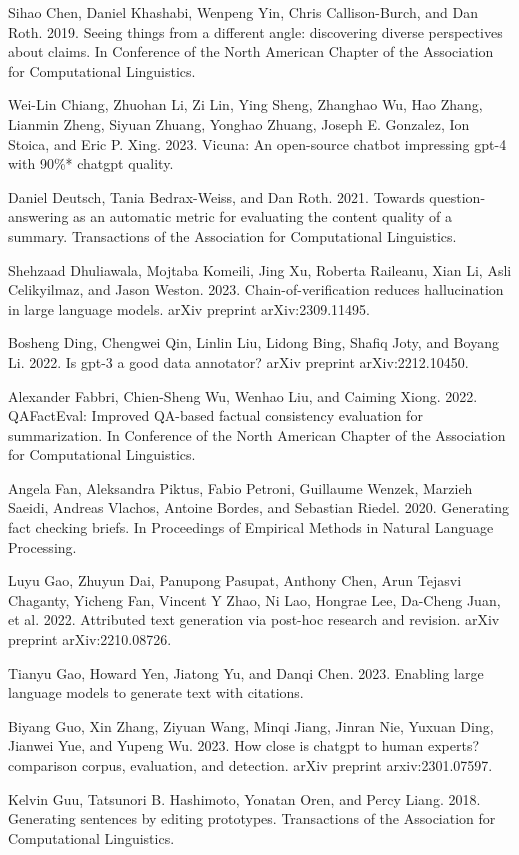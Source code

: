 \documentclass[11pt,UTF8,fontset=fandol]{ctexart}
\begin{document}
Sihao Chen, Daniel Khashabi, Wenpeng Yin, Chris Callison-Burch, and Dan Roth. 2019. Seeing things from a different angle: discovering diverse perspectives about claims. In Conference of the North American Chapter of the Association for Computational Linguistics.

Wei-Lin Chiang, Zhuohan Li, Zi Lin, Ying Sheng, Zhanghao Wu, Hao Zhang, Lianmin Zheng, Siyuan Zhuang, Yonghao Zhuang, Joseph E. Gonzalez, Ion Stoica, and Eric P. Xing. 2023. Vicuna: An open-source chatbot impressing gpt-4 with 90\%* chatgpt quality.

Daniel Deutsch, Tania Bedrax-Weiss, and Dan Roth. 2021. Towards question-answering as an automatic metric for evaluating the content quality of a summary. Transactions of the Association for Computational Linguistics.

Shehzaad Dhuliawala, Mojtaba Komeili, Jing Xu, Roberta Raileanu, Xian Li, Asli Celikyilmaz, and Jason Weston. 2023. Chain-of-verification reduces hallucination in large language models. arXiv preprint arXiv:2309.11495.

Bosheng Ding, Chengwei Qin, Linlin Liu, Lidong Bing, Shafiq Joty, and Boyang Li. 2022. Is gpt-3 a good data annotator? arXiv preprint arXiv:2212.10450.

Alexander Fabbri, Chien-Sheng Wu, Wenhao Liu, and Caiming Xiong. 2022. QAFactEval: Improved QA-based factual consistency evaluation for summarization. In Conference of the North American Chapter of the Association for Computational Linguistics.

Angela Fan, Aleksandra Piktus, Fabio Petroni, Guillaume Wenzek, Marzieh Saeidi, Andreas Vlachos, Antoine Bordes, and Sebastian Riedel. 2020. Generating fact checking briefs. In Proceedings of Empirical Methods in Natural Language Processing.

Luyu Gao, Zhuyun Dai, Panupong Pasupat, Anthony Chen, Arun Tejasvi Chaganty, Yicheng Fan, Vincent Y Zhao, Ni Lao, Hongrae Lee, Da-Cheng Juan, et al. 2022. Attributed text generation via post-hoc research and revision. arXiv preprint arXiv:2210.08726.

Tianyu Gao, Howard Yen, Jiatong Yu, and Danqi Chen. 2023. Enabling large language models to generate text with citations.

Biyang Guo, Xin Zhang, Ziyuan Wang, Minqi Jiang, Jinran Nie, Yuxuan Ding, Jianwei Yue, and Yupeng Wu. 2023. How close is chatgpt to human experts? comparison corpus, evaluation, and detection. arXiv preprint arxiv:2301.07597.

Kelvin Guu, Tatsunori B. Hashimoto, Yonatan Oren, and Percy Liang. 2018. Generating sentences by editing prototypes. Transactions of the Association for Computational Linguistics.
\end{document}
